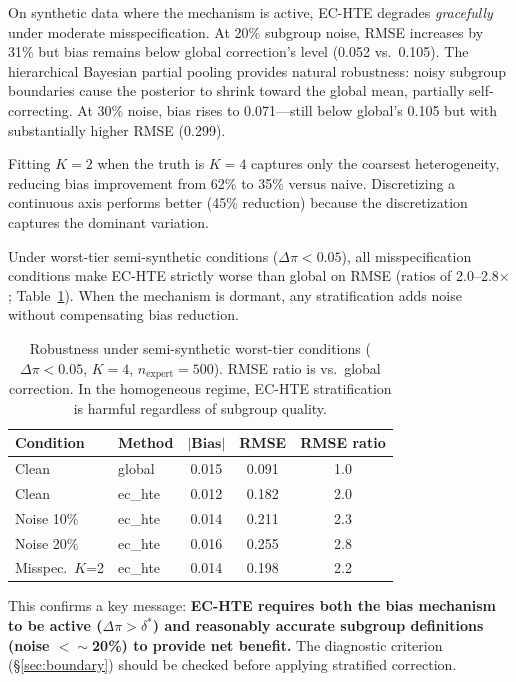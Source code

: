 \documentclass[11pt,a4paper]{article}
\begin{document}
On synthetic data where the mechanism is active, EC-HTE degrades \emph{gracefully} under moderate misspecification.
At 20\% subgroup noise, RMSE increases by 31\% but bias remains below global correction's level (0.052 vs.\ 0.105).
The hierarchical Bayesian partial pooling provides natural robustness: noisy subgroup boundaries cause the posterior to shrink toward the global mean, partially self-correcting.
At 30\% noise, bias rises to 0.071---still below global's 0.105 but with substantially higher RMSE (0.299).

Fitting $K=2$ when the truth is $K=4$ captures only the coarsest heterogeneity, reducing bias improvement from 62\% to 35\% versus naive.
Discretizing a continuous axis performs better (45\% reduction) because the discretization captures the dominant variation.

Under worst-tier semi-synthetic conditions ($\Delta\pi < 0.05$), all misspecification conditions make EC-HTE strictly worse than global on RMSE (ratios of 2.0--2.8$\times$; Table~\ref{tab:robustness_semi}).
When the mechanism is dormant, any stratification adds noise without compensating bias reduction.

\begin{table}[t]
\centering
\small
\begin{tabular}{@{}llccc@{}}
\toprule
\textbf{Condition} & \textbf{Method} & $|\textbf{Bias}|$ & \textbf{RMSE} & \textbf{RMSE ratio} \\
\midrule
Clean & global & 0.015 & 0.091 & 1.0 \\
Clean & ec\_hte & 0.012 & 0.182 & 2.0 \\
Noise 10\% & ec\_hte & 0.014 & 0.211 & 2.3 \\
Noise 20\% & ec\_hte & 0.016 & 0.255 & 2.8 \\
Misspec.\ $K$=2 & ec\_hte & 0.014 & 0.198 & 2.2 \\
\bottomrule
\end{tabular}
\caption{Robustness under semi-synthetic worst-tier conditions ($\Delta\pi<0.05$, $K=4$, $n_{\text{expert}}=500$). RMSE ratio is vs.\ global correction. In the homogeneous regime, EC-HTE stratification is harmful regardless of subgroup quality.}
\label{tab:robustness_semi}
\end{table}

This confirms a key message: \textbf{EC-HTE requires both the bias mechanism to be active ($\Delta\pi > \delta^*$) and reasonably accurate subgroup definitions (noise $< \sim$20\%) to provide net benefit.}
The diagnostic criterion (\S\ref{sec:boundary}) should be checked before applying stratified correction.
\end{document}
